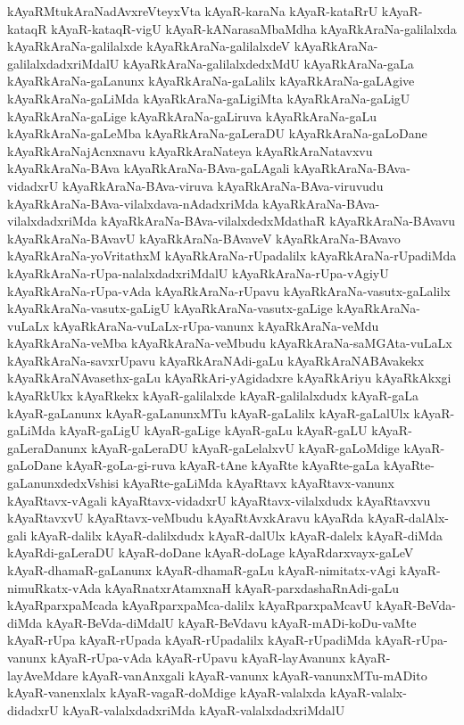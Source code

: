{kAyaRMtukAraNadAvxreVteyxVta
kAyaR-karaNa
kAyaR-kataRrU
kAyaR-kataqR
kAyaR-kataqR-vigU
kAyaR-kANarasaMbaMdha
kAyaRkAraNa-galilalxda
kAyaRkAraNa-galilalxde
kAyaRkAraNa-galilalxdeV
kAyaRkAraNa-galilalxdadxriMdalU
kAyaRkAraNa-galilalxdedxMdU
kAyaRkAraNa-gaLa
kAyaRkAraNa-gaLanunx
kAyaRkAraNa-gaLalilx
kAyaRkAraNa-gaLAgive
kAyaRkAraNa-gaLiMda
kAyaRkAraNa-gaLigiMta
kAyaRkAraNa-gaLigU
kAyaRkAraNa-gaLige
kAyaRkAraNa-gaLiruva
kAyaRkAraNa-gaLu
kAyaRkAraNa-gaLeMba
kAyaRkAraNa-gaLeraDU
kAyaRkAraNa-gaLoDane
kAyaRkAraNajAcnxnavu
kAyaRkAraNateya
kAyaRkAraNatavxvu
kAyaRkAraNa-BAva
kAyaRkAraNa-BAva-gaLAgali
kAyaRkAraNa-BAva-vidadxrU
kAyaRkAraNa-BAva-viruva
kAyaRkAraNa-BAva-viruvudu
kAyaRkAraNa-BAva-vilalxdava-nAdadxriMda
kAyaRkAraNa-BAva-vilalxdadxriMda
kAyaRkAraNa-BAva-vilalxdedxMdathaR
kAyaRkAraNa-BAvavu
kAyaRkAraNa-BAvavU
kAyaRkAraNa-BAvaveV
kAyaRkAraNa-BAvavo
kAyaRkAraNa-yoVritathxM
kAyaRkAraNa-rUpadalilx
kAyaRkAraNa-rUpadiMda
kAyaRkAraNa-rUpa-nalalxdadxriMdalU
kAyaRkAraNa-rUpa-vAgiyU
kAyaRkAraNa-rUpa-vAda
kAyaRkAraNa-rUpavu
kAyaRkAraNa-vasutx-gaLalilx
kAyaRkAraNa-vasutx-gaLigU
kAyaRkAraNa-vasutx-gaLige
kAyaRkAraNa-vuLaLx
kAyaRkAraNa-vuLaLx-rUpa-vanunx
kAyaRkAraNa-veMdu
kAyaRkAraNa-veMba
kAyaRkAraNa-veMbudu
kAyaRkAraNa-saMGAta-vuLaLx
kAyaRkAraNa-savxrUpavu
kAyaRkAraNAdi-gaLu
kAyaRkAraNABAvakekx
kAyaRkAraNAvasethx-gaLu
kAyaRkAri-yAgidadxre
kAyaRkAriyu
kAyaRkAkxgi
kAyaRkUkx
kAyaRkekx
kAyaR-galilalxde
kAyaR-galilalxdudx
kAyaR-gaLa
kAyaR-gaLanunx
kAyaR-gaLanunxMTu
kAyaR-gaLalilx
kAyaR-gaLalUlx
kAyaR-gaLiMda
kAyaR-gaLigU
kAyaR-gaLige
kAyaR-gaLu
kAyaR-gaLU
kAyaR-gaLeraDanunx
kAyaR-gaLeraDU
kAyaR-gaLelalxvU
kAyaR-gaLoMdige
kAyaR-gaLoDane
kAyaR-goLa-gi-ruva
kAyaR-tAne
kAyaRte
kAyaRte-gaLa
kAyaRte-gaLanunxdedxVshisi
kAyaRte-gaLiMda
kAyaRtavx
kAyaRtavx-vanunx
kAyaRtavx-vAgali
kAyaRtavx-vidadxrU
kAyaRtavx-vilalxdudx
kAyaRtavxvu
kAyaRtavxvU
kAyaRtavx-veMbudu
kAyaRtAvxkAravu
kAyaRda
kAyaR-dalAlx-gali
kAyaR-dalilx
kAyaR-dalilxdudx
kAyaR-dalUlx
kAyaR-dalelx
kAyaR-diMda
kAyaRdi-gaLeraDU
kAyaR-doDane
kAyaR-doLage
kAyaRdarxvayx-gaLeV
kAyaR-dhamaR-gaLanunx
kAyaR-dhamaR-gaLu
kAyaR-nimitatx-vAgi
kAyaR-nimuRkatx-vAda
kAyaRnatxrAtamxnaH
kAyaR-parxdashaRnAdi-gaLu
kAyaRparxpaMcada
kAyaRparxpaMca-dalilx
kAyaRparxpaMcavU
kAyaR-BeVda-diMda
kAyaR-BeVda-diMdalU
kAyaR-BeVdavu
kAyaR-mADi-koDu-vaMte
kAyaR-rUpa
kAyaR-rUpada
kAyaR-rUpadalilx
kAyaR-rUpadiMda
kAyaR-rUpa-vanunx
kAyaR-rUpa-vAda
kAyaR-rUpavu
kAyaR-layAvanunx
kAyaR-layAveMdare
kAyaR-vanAnxgali
kAyaR-vanunx
kAyaR-vanunxMTu-mADito
kAyaR-vanenxlalx
kAyaR-vagaR-doMdige
kAyaR-valalxda
kAyaR-valalx-didadxrU
kAyaR-valalxdadxriMda
kAyaR-valalxdadxriMdalU
}
